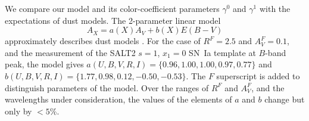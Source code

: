 \documentclass{aastex61}   	%
\begin{document}
%
%

We compare our model and its color-coefficient parameters $\gamma^0$ and $\gamma^1$ with the expectations of  dust models.
The 2-parameter linear model
\begin{equation}
A_X = a(X)  A_V + b(X) E(B-V)
\label{f99:eqn}
\end{equation}
approximately describes dust models \citep[e.g][]{1989ApJ...345..245C}.
For the case of
$R^F=2.5$ and $A^F_V=0.1$,
and the measurement of the SALT2
\citet{2007A&A...466...11G} $s=1$, $x_1=0$ SN~Ia template at $B$-band peak, the  model
gives
$a(U,B,V,R,I)=\{0.96,   1.00,   1.00,   0.97,   0.77\}$ and $b(U,B,V,R,I)=\{  1.77,   0.98,   0.12,  -0.50,  -0.53\}$.
The $F$ superscript is added to distinguish parameters of the  model.
Over the ranges of
 $R^F$ and $A^F_V$,
and the wavelengths under consideration,  the values of the elements of $a$ and $b$ change but only by $<5$\%.
\end{document}
